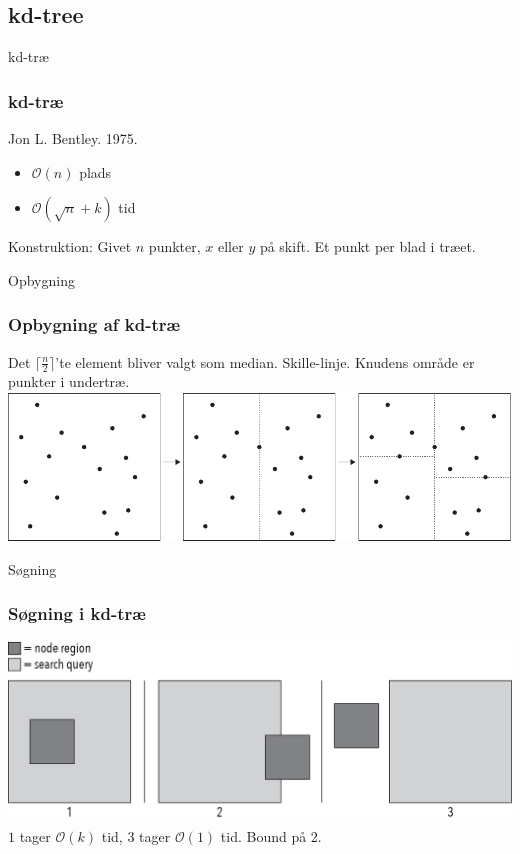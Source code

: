 \documentclass[pdf]{beamer}
\begin{document}
\subsection{kd-tree}

\begin{frame}{kd-træ}
  \frametitle{kd-træ}
  Jon L. Bentley. 1975.
  \begin{itemize}
    \item $\mathcal{O}(n)$ plads
    \item $\mathcal{O}(\sqrt{n} + k)$ tid
  \end{itemize}

  Konstruktion: Givet $n$ punkter, $x$ eller $y$ på skift. Et punkt per blad i træet.
\end{frame}

\begin{frame}{Opbygning}
  \frametitle{Opbygning af kd-træ}
  Det $\lceil \frac{n}{2} \rceil$'te element bliver valgt som median. Skille-linje. Knudens område er punkter i undertræ.
  \includegraphics[scale=0.75]{pictures/kd_subdivision-eps-converted-to.pdf}

\end{frame}


\begin{frame}{Søgning}
  \frametitle{Søgning i kd-træ}
  \begin{center}
    \includegraphics[scale=0.75]{pictures/search_query_overlap.png} \\

    $1$ tager $\mathcal{O}(k)$ tid, $3$ tager $\mathcal{O}(1)$ tid. Bound på $2$.\\


  \end{center}

\end{frame}
\end{document}
